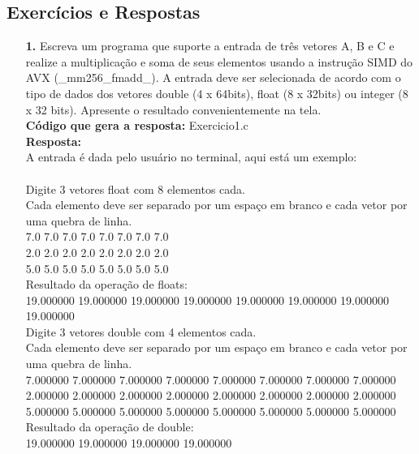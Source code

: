 \documentclass[oneside,a4paper,12pt]{article}
\renewcommand{\b}{\textbf}
\begin{document}
\subsection*{Exercícios e Respostas}
\begin{enumerate}
    \item[\b{1.}] Escreva um programa que suporte a entrada de três vetores A, B e C e realize a multiplicação e soma de seus elementos usando a instrução SIMD do AVX (\_mm256\_fmadd\_). A entrada deve ser selecionada de acordo com o tipo de dados dos vetores double (4 x 64bits), float (8 x 32bits) ou integer (8 x 32 bits). Apresente o resultado convenientemente na tela.\\
    
    \b{Código que gera a resposta:} Exercicio1.c\\
    \b{Resposta:}\\
    A entrada é dada pelo usuário no terminal, aqui está um exemplo:\\
    \\
        Digite 3 vetores float com 8 elementos cada.\\
        Cada elemento deve ser separado por um espaço em branco e cada vetor por uma quebra de linha.\\
        7.0 7.0 7.0 7.0 7.0 7.0 7.0 7.0\\
        2.0 2.0 2.0 2.0 2.0 2.0 2.0 2.0\\
        5.0 5.0 5.0 5.0 5.0 5.0 5.0 5.0\\
        Resultado da operação de floats:\\
        19.000000 19.000000 19.000000 19.000000 19.000000 19.000000 19.000000 19.000000\\

        Digite 3 vetores double com 4 elementos cada.\\
        Cada elemento deve ser separado por um espaço em branco e cada vetor por uma quebra de linha.\\
        7.000000 7.000000 7.000000 7.000000 7.000000 7.000000 7.000000 7.000000\\
        2.000000 2.000000 2.000000 2.000000 2.000000 2.000000 2.000000 2.000000\\
        5.000000 5.000000 5.000000 5.000000 5.000000 5.000000 5.000000 5.000000\\
        Resultado da operação de double:\\
        19.000000 19.000000 19.000000 19.000000\\


\end{enumerate}
\end{document}

